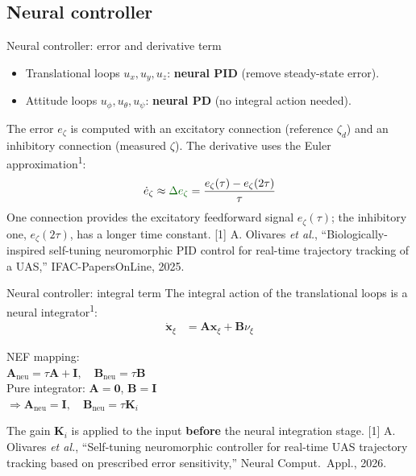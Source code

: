 \documentclass{beamer}
\newcommand{\slideref}[1]{\vfill{\tiny #1}}
\begin{document}
\subsection{Neural controller}
\begin{frame}{Neural controller: error and derivative term}
\begin{itemize}
    \item Translational loops $u_x,u_y,u_z$: \textbf{neural PID} (remove steady-state error).
    \item Attitude loops $u_\phi,u_\theta,u_\psi$: \textbf{neural PD} (no integral action needed).
\end{itemize}
The error $e_\zeta$ is computed with an excitatory connection (reference $\zeta_d$) and an inhibitory connection (measured $\zeta$). The derivative uses the Euler approximation\textsuperscript{1}:
\begin{equation*}
\dot e_\zeta \approx \textcolor{darkgreen}{\Delta e_\zeta} = \frac{e_\zeta(\tau)-e_\zeta(2\tau)}{\tau}
\end{equation*}
One connection provides the excitatory feedforward signal $e_\zeta(\tau)$; the inhibitory one, $e_\zeta(2\tau)$, has a longer time constant.
\slideref{[1] A. Olivares \emph{et al.}, ``Biologically-inspired self-tuning neuromorphic PID control for real-time trajectory tracking of a UAS,'' IFAC-PapersOnLine, 2025.}
\end{frame}

\begin{frame}{Neural controller: integral term}
The integral action of the translational loops is a neural integrator\textsuperscript{1}:
\begin{align*}
    \dot{\mathbf{x}}_\xi &= \mathbf{A}\mathbf{x}_\xi + \mathbf{B}\nu_\xi
\end{align*}
\begin{tcolorbox}[
    tabularx = {l},
    colback = morado!10,
    colframe = morado!80
]
    NEF mapping:\\
    \hline \hline
    $\mathbf{A}_{\text{neu}} = \tau \mathbf{A} + \mathbf{I}, \quad \mathbf{B}_{\text{neu}} = \tau \mathbf{B}$\\
    Pure integrator: $\mathbf{A} = \mathbf{0}$, $\mathbf{B} = \mathbf{I}$\\
    $\Rightarrow \mathbf{A}_{\text{neu}} = \mathbf{I}, \quad \mathbf{B}_{\text{neu}} = \tau \mathbf{K}_i$\\
\end{tcolorbox}
The gain $\mathbf{K}_i$ is applied to the input \textbf{before} the neural integration stage.
\slideref{[1] A. Olivares \emph{et al.}, ``Self-tuning neuromorphic controller for real-time UAS trajectory tracking based on prescribed error sensitivity,'' Neural Comput.\ Appl., 2026.}
\end{frame}
\end{document}
